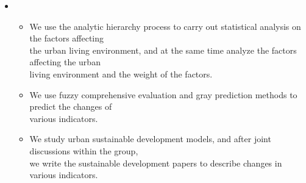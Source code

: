 \newpage
{}
  \begin{itemize}[leftmargin=*]
    \item
      {\small
      \begin{itemize}
      \item We use the analytic hierarchy process to carry out statistical analysis on the factors affecting \\the urban living environment, and at the same time analyze the factors affecting the urban \\living environment and the weight of the factors.
        \item We use fuzzy comprehensive evaluation and gray prediction methods to predict the changes of \\various indicators.
        \item We study urban sustainable development models, and after joint discussions within the group, \\we write the sustainable development papers to describe changes in various indicators.
      \end{itemize}
      }
    

\end{itemize}
